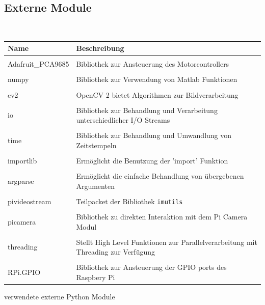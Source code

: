   \subsection{Externe Module}
  \ \\
  \begin{minipage}{\columnwidth}
    \makeatletter
    \def\@captype{table}
    \makeatother
    \centering
    \begin{tabular}{p{3.5cm}|p{11cm}}
    Name & Beschreibung \\ \hline \hline
      & \\
    Adafruit\_PCA9685 & Bibliothek zur Ansteuerung des Motorcontrollers \\
      & \\
    numpy & Bibliothek zur Verwendung von Matlab Funktionen \\
      & \\
    cv2 & OpenCV 2 bietet Algorithmen zur Bildverarbeitung \\
      & \\
    io & Bibliothek zur Behandlung und Verarbeitung unterschiedlicher I/O Streams\\
      & \\
    time & Bibliothek zur Behandlung und Umwandlung von Zeitstempeln \\
      & \\
    importlib & Ermöglicht die Benutzung der 'import' Funktion \\
      & \\
    argparse & Ermöglicht die einfache Behandlung von übergebenen Argumenten\\
      & \\
    pivideostream & Teilpacket der Bibliothek \texttt{imutils}\\
      & \\
    picamera & Bibliothek zu direkten Interaktion mit dem Pi Camera Modul \\
      & \\
    threading & Stellt High Level Funktionen zur Parallelverarbeitung mit Threading zur Verfügung \\
      & \\
    RPi.GPIO & Bibliothek zur Ansteuerung der GPIO ports des Raspbery Pi \\
    \end{tabular}
    \caption{verwendete externe Python Module}
    \label{tab:sw-01}
  \end{minipage}
  
